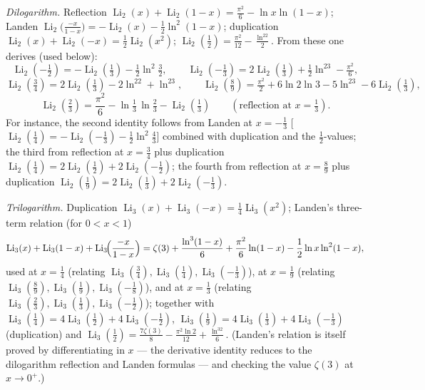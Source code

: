 \documentclass[11pt]{article}
\theoremstyle{remark}
\begin{document}
\emph{Dilogarithm.} Reflection $\operatorname{Li}_2(x)+\operatorname{Li}_2(1-x)=\frac{\pi^2}6-\ln x\ln(1-x)$; Landen $\operatorname{Li}_2\bigl(\frac{-x}{1-x}\bigr)=-\operatorname{Li}_2(x)-\frac12\ln^2(1-x)$; duplication $\operatorname{Li}_2(x)+\operatorname{Li}_2(-x)=\frac12\operatorname{Li}_2(x^2)$; $\operatorname{Li}_2(\tfrac12)=\frac{\pi^2}{12}-\frac{\ln^22}2$. From these one derives (used below):
\[\operatorname{Li}_2\!\left(-\tfrac12\right)=-\operatorname{Li}_2\!\left(\tfrac13\right)-\tfrac12\ln^2\tfrac32,\qquad
\operatorname{Li}_2\!\left(-\tfrac13\right)=2\operatorname{Li}_2\!\left(\tfrac13\right)+\tfrac12\ln^23-\tfrac{\pi^2}6,\]
\[\operatorname{Li}_2\!\left(\tfrac34\right)=2\operatorname{Li}_2\!\left(\tfrac13\right)-2\ln^22+\ln^23,\qquad
\operatorname{Li}_2\!\left(\tfrac89\right)=\tfrac{\pi^2}2+6\ln2\ln3-5\ln^23-6\operatorname{Li}_2\!\left(\tfrac13\right),\]
\[\operatorname{Li}_2\!\left(\tfrac23\right)=\frac{\pi^2}{6}-\ln\tfrac13\,\ln\tfrac23-\operatorname{Li}_2\!\left(\tfrac13\right)\qquad(\text{reflection at }x=\tfrac13).\]
For instance, the second identity follows from Landen at $x=-\frac13$ [$\operatorname{Li}_2(\frac14)=-\operatorname{Li}_2(-\frac13)-\frac12\ln^2\frac43$] combined with duplication and the $\frac12$-values; the third from reflection at $x=\frac34$ plus duplication $\operatorname{Li}_2(\frac14)=2\operatorname{Li}_2(\frac12)+2\operatorname{Li}_2(-\frac12)$; the fourth from reflection at $x=\frac89$ plus duplication $\operatorname{Li}_2(\frac19)=2\operatorname{Li}_2(\frac13)+2\operatorname{Li}_2(-\frac13)$.

\emph{Trilogarithm.} Duplication $\operatorname{Li}_3(x)+\operatorname{Li}_3(-x)=\frac14\operatorname{Li}_3(x^2)$; Landen's three-term relation (for $0<x<1$)
\[\operatorname{Li}_3(x)+\operatorname{Li}_3(1-x)+\operatorname{Li}_3\!\Bigl(\frac{-x}{1-x}\Bigr)
=\zeta(3)+\frac{\ln^3(1-x)}{6}+\frac{\pi^2}{6}\ln(1-x)-\frac12\ln x\ln^2(1-x),\]
used at $x=\frac14$ (relating $\operatorname{Li}_3(\frac34),\operatorname{Li}_3(\frac14),\operatorname{Li}_3(-\frac13)$), at $x=\frac19$ (relating $\operatorname{Li}_3(\frac89),\operatorname{Li}_3(\frac19),\operatorname{Li}_3(-\frac18)$), and at $x=\frac13$ (relating $\operatorname{Li}_3(\frac23),\operatorname{Li}_3(\frac13),\operatorname{Li}_3(-\frac12)$); together with
$\operatorname{Li}_3(\frac14)=4\operatorname{Li}_3(\frac12)+4\operatorname{Li}_3(-\frac12)$, $\operatorname{Li}_3(\frac19)=4\operatorname{Li}_3(\frac13)+4\operatorname{Li}_3(-\frac13)$ (duplication) and
$\operatorname{Li}_3(\tfrac12)=\frac{7\zeta(3)}8-\frac{\pi^2\ln2}{12}+\frac{\ln^32}6$.
(Landen's relation is itself proved by differentiating in $x$ --- the derivative identity reduces to the dilogarithm reflection and Landen formulas --- and checking the value $\zeta(3)$ at $x\to0^+$.)
\end{document}
